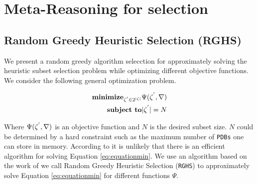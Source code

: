 
 
\chapter{Meta-Reasoning for selection}\label{rghs}


\section{Random Greedy Heuristic Selection (RGHS)}
\noindent
We present a random greedy algorithm selecction for approximately solving the heuristic subset selection problem while optimizing different objective functions. We consider the following general optimization problem.

\begin{equation}
\begin{split}
\textbf{minimize}_{\zeta\sp{'} \in 2\sp{|\zeta|}}\Psi(\zeta\sp{'}, \nabla) \\
\textbf{subject to} |\zeta\sp{'}| = N
\end{split}
\label{eq:equationmin}
\end{equation}

Where $\Psi(\zeta\sp{'},\nabla)$ is an objective function and $N$ is the desired subset size. $N$ could be determined by a hard constraint such as the maximum number of \texttt{PDBs} one can store in memory. According to \cite{raynersss13} it is unlikely that there is an efficient algorithm for solving Equation \ref{eq:equationmin}. We use an algorithm based on the work of \cite{buchbinder2014submodular} we call Random Greedy Heuristic Selection (\texttt{RGHS}) to approximately solve Equation \ref{eq:equationmin} for different functions $\Psi$.\\

